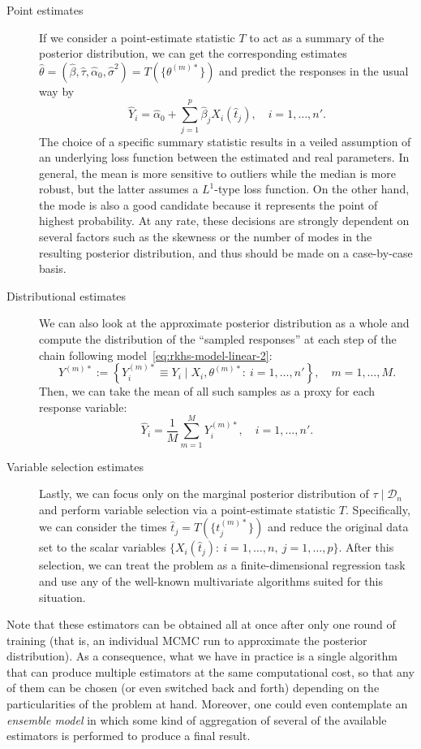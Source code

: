 \documentclass[ba]{imsart}
\numberwithin{equation}{section}
\theoremstyle{plain}
\begin{document}
\begin{description}
  \item[Point estimates] If we consider a point-estimate statistic \(T\) to act as a summary of the posterior distribution, we can get the corresponding estimates \(\hat{\theta}=(\hat \beta, \hat \tau, \hat{\alpha}_0, \hat{\sigma}^2) = T(\{\theta^{(m)*}\})\) and predict the responses in the usual way by
  \[
    \hat Y_i = \hat{\alpha}_0 + \sum_{j=1}^p \hat{\beta}_j X_i(\hat{t}_j), \quad i=1,\dots, n'.
  \]
  The choice of a specific summary statistic results in a veiled assumption of an underlying loss function between the estimated and real parameters. In general, the mean is more sensitive to outliers while the median is more robust, but the latter assumes a \(L^1\)-type loss function. On the other hand, the mode is also a good candidate because it represents the point of highest probability. At any rate, these decisions are strongly dependent on several factors such as the skewness or the number of modes in the resulting posterior distribution, and thus should be made on a case-by-case basis.
  \item[Distributional estimates] We can also look at the approximate posterior distribution as a whole and compute the distribution of the ``sampled responses'' at each step of the chain following model~\eqref{eq:rkhs-model-linear-2}:
  \[
  Y^{(m)*} := \left\{Y_i^{(m)*} \equiv Y_i \mid X_i, \theta^{(m)*}:\ i=1,\dots,n'\right\}, \quad m=1,\dots,M.
  \]
  Then, we can take the mean of all such samples as a proxy for each response variable:
  \[
  \hat Y_i = \frac{1}{M}\sum_{m=1}^M Y_i^{(m)*}, \quad i=1,\dots,n'.
  \]
  \item[Variable selection estimates] Lastly, we can focus only on the marginal posterior distribution of \(\tau\mid\mathcal D_n\) and perform variable selection via a point-estimate statistic \(T\). Specifically, we can consider the times \(\hat t_j = T(\{t_j^{(m)*}\})\) and reduce the original data set to the scalar variables \(\{X_i(\hat t_j):\ i=1, \dots,n, \ j=1,\dots,p\}\). After this selection, we can treat the problem as a finite-dimensional regression task and use any of the well-known multivariate algorithms suited for this situation.
\end{description}

Note that these estimators can be obtained all at once after only one round of training (that is, an individual MCMC run to approximate the posterior distribution). As a consequence, what we have in practice is a single algorithm that can produce multiple estimators at the same computational cost, so that any of them can be chosen (or even switched back and forth) depending on the particularities of the problem at hand. Moreover, one could even contemplate an \textit{ensemble model} in which some kind of aggregation of several of the available estimators is performed to produce a final result.
\end{document}

